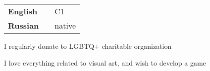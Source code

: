 \documentclass[9pt]{template/developercv}
\begin{document}
\begin{minipage}[t]{0.3\textwidth}
	\vspace{-2\baselineskip}


	\begin{tabular}{lp{}l}
		\textbf{English} & & C1\\
		\textbf{Russian} & & native\\
	\end{tabular}
\end{minipage}
\hfill
\begin{minipage}[t]{0.3\textwidth}
	\vspace{-2\baselineskip}


	I regularly donate to LGBTQ+ charitable organization
\end{minipage}
\hfill
\begin{minipage}[t]{0.3\textwidth}
	\vspace{-2\baselineskip}


	I love everything related to visual art, and wish to develop a game
\end{minipage}
\end{document}
